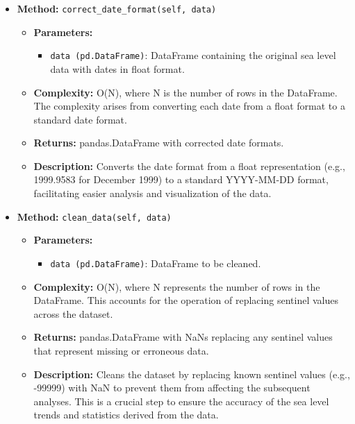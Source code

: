 \documentclass[a4paper,12pt]{article}
\begin{document}
\begin{itemize}
    \item \textbf{Method:} \texttt{correct\_date\_format(self, data)}
    \begin{itemize}
        \item \textbf{Parameters:}
        \begin{itemize}
            \item \texttt{data (pd.DataFrame)}: DataFrame containing the original sea level data with dates in float format.
        \end{itemize}
        \item \textbf{Complexity:} O(N), where N is the number of rows in the DataFrame. The complexity arises from converting each date from a float format to a standard date format.
        \item \textbf{Returns:} pandas.DataFrame with corrected date formats.
        \item \textbf{Description:} Converts the date format from a float representation (e.g., 1999.9583 for December 1999) to a standard YYYY-MM-DD format, facilitating easier analysis and visualization of the data.
    \end{itemize}

    \item \textbf{Method:} \texttt{clean\_data(self, data)}
    \begin{itemize}
        \item \textbf{Parameters:}
        \begin{itemize}
            \item \texttt{data (pd.DataFrame)}: DataFrame to be cleaned.
        \end{itemize}
        \item \textbf{Complexity:} O(N), where N represents the number of rows in the DataFrame. This accounts for the operation of replacing sentinel values across the dataset.
        \item \textbf{Returns:} pandas.DataFrame with NaNs replacing any sentinel values that represent missing or erroneous data.
        \item \textbf{Description:} Cleans the dataset by replacing known sentinel values (e.g., -99999) with NaN to prevent them from affecting the subsequent analyses. This is a crucial step to ensure the accuracy of the sea level trends and statistics derived from the data.
    \end{itemize}


\end{itemize}
\end{document}
